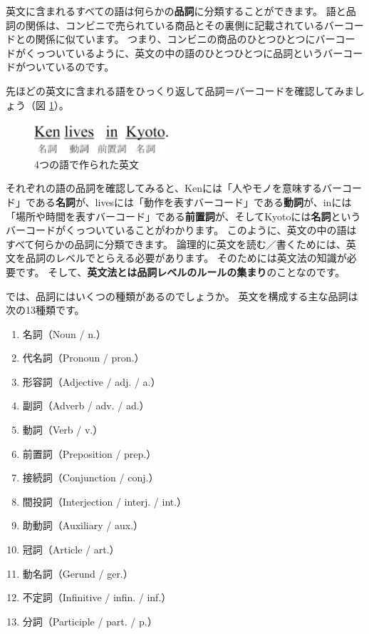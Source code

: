 \documentclass[12pt,titlepage]{jsarticle}
\begin{document}
 英文に含まれるすべての語は何らかの{\bf 品詞}に分類することができます。
 語と品詞の関係は、コンビニで売られている商品とその裏側に記載されているバーコードとの関係に似ています。
 つまり、コンビニの商品のひとつひとつにバーコードがくっついているように、英文の中の語のひとつひとつに品詞というバーコードがついているのです。

 先ほどの英文に含まれる語をひっくり返して品詞＝バーコードを確認してみましょう（図 \ref{fig2}）。

 \begin{figure}[htbp]
  \begin{center}
   \includegraphics[width=5cm]{./figure/fig2.pdf}
   \caption{4つの語で作られた英文}
   \label{fig2}
  \end{center}
 \end{figure}


 それぞれの語の品詞を確認してみると、Kenには「人やモノを意味するバーコード」である{\bf 名詞}が、livesには「動作を表すバーコード」である{\bf 動詞}が、inには「場所や時間を表すバーコード」である{\bf 前置詞}が、そしてKyotoには{\bf 名詞}というバーコードがくっついていることがわかります。
 このように、英文の中の語はすべて何らかの品詞に分類できます。
 論理的に英文を読む／書くためには、英文を品詞のレベルでとらえる必要があります。
 そのためには英文法の知識が必要です。
 そして、{\bf 英文法とは品詞レベルのルールの集まり}のことなのです。

 では、品詞にはいくつの種類があるのでしょうか。
 英文を構成する主な品詞は次の13種類です。

 \begin{enumerate}
  \item 名詞（Noun / n.）
  \item 代名詞（Pronoun / pron.）
  \item 形容詞（Adjective / adj. / a.）
  \item 副詞（Adverb / adv. / ad.）
  \item 動詞（Verb / v.）
  \item 前置詞（Preposition / prep.）
  \item 接続詞（Conjunction / conj.）
  \item 間投詞（Interjection / interj. / int.）
  \item 助動詞（Auxiliary / aux.）
  \item 冠詞（Article / art.）
  \item 動名詞（Gerund / ger.）
  \item 不定詞（Infinitive / infin. / inf.）
  \item 分詞（Participle / part. / p.）
 \end{enumerate}
 
\end{document}
